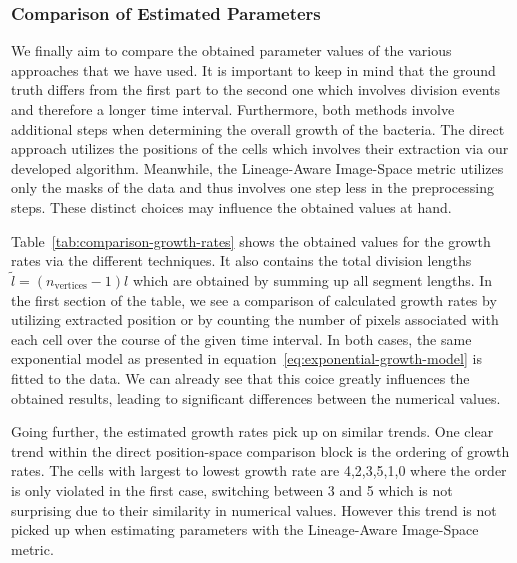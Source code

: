 \subsubsection{Comparison of Estimated Parameters}
We finally aim to compare the obtained parameter values of the various approaches
that we have used.
It is important to keep in mind that the ground truth differs from the first part to
the second one
which involves division events and therefore a longer time interval.
Furthermore, both methods involve additional steps when determining the overall growth of the
bacteria.
The direct approach utilizes the positions of the cells which involves their extraction via our
developed algorithm.
Meanwhile, the Lineage-Aware Image-Space metric utilizes only the masks of the data and thus
involves one step less in the preprocessing steps.
These distinct choices may influence the obtained values at hand.

Table~\ref{tab:comparison-growth-rates} shows the obtained values for the growth rates via the
different techniques.
It also contains the total division lengths $\tilde{l}=(n_\text{vertices}-1)l$ which
are obtained by
summing up all segment lengths.
In the first section of the table, we see a comparison of calculated growth rates by utilizing
extracted position or by counting the number of pixels associated with each cell over
the course of
the given time interval.
In both cases, the same exponential model as presented in
equation~\ref{eq:exponential-growth-model}
is fitted to the data.
We can already see that this coice greatly influences the obtained results, leading
to significant
differences between the numerical values.

Going further, the estimated growth rates pick up on similar trends.
One clear trend within the direct position-space comparison block is the ordering of
growth rates.
The cells with largest to lowest growth rate are 4,2,3,5,1,0 where the order is only violated in
the first case, switching between 3 and 5 which is not surprising due to their similarity in
numerical values.
However this trend is not picked up when estimating parameters with the Lineage-Aware
Image-Space
metric.

